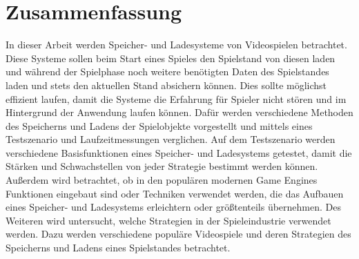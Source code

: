 \chapter*{Zusammenfassung}


In dieser Arbeit werden Speicher- und Ladesysteme von Videospielen betrachtet. Diese Systeme sollen beim Start eines Spieles den Spielstand von diesen laden und während der Spielphase noch weitere benötigten Daten des Spielstandes laden und stets den aktuellen Stand absichern können. Dies sollte möglichst effizient laufen, damit die Systeme die Erfahrung für Spieler nicht stören und im Hintergrund der Anwendung laufen können. Dafür werden verschiedene Methoden des Speicherns und Ladens der Spielobjekte vorgestellt und mittels eines Testszenario und Laufzeitmessungen verglichen. Auf dem Testszenario werden verschiedene Basisfunktionen eines Speicher- und Ladesystems getestet, damit die Stärken und Schwachstellen von jeder Strategie bestimmt werden können. Außerdem wird betrachtet, ob in den populären modernen Game Engines Funktionen eingebaut sind oder Techniken verwendet werden, die das Aufbauen eines Speicher- und Ladesystems erleichtern oder größtenteils übernehmen. Des Weiteren wird untersucht, welche Strategien in der Spieleindustrie verwendet werden. Dazu werden verschiedene populäre Videospiele und deren Strategien des Speicherns und Ladens eines Spielstandes betrachtet.
